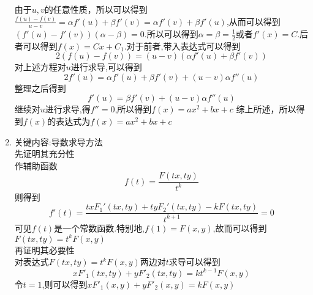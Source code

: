\documentclass[UTF8,a4paper,10pt]{ctexart}
\begin{document}
\begin{flushleft}
\begin{enumerate}
			由于$u,v$的任意性质，所以可以得到$\frac{f(u)-f(v)}{u-v}=\alpha f{'}(u)+\beta f{'}(v)=\alpha f{'}(v)+\beta f{'}(u)$,从而可以得到$(f{'}(u)-f{'}(v))(\alpha-\beta)=0$.所以可以得到$\alpha=\beta=\frac{1}{2}$或者$f{'}(x)=C$.后者可以得到$f(x)=Cx+C_{1}$.对于前者,带入表达式可以得到
			\begin{equation}
				2(f(u)-f(v))=(u-v)(\alpha f{'}(u)+\beta f{'}(v))\nonumber
			\end{equation}
			对上述方程对$u$进行求导,可以得到
			\begin{equation}
				2f{'}(u)=\alpha f{'}(u)+\beta f{'}(v)+(u-v)\alpha f{''}(u)\nonumber
			\end{equation}
			整理之后得到
			\begin{equation}
				f{'}(u)=\beta f{'}(v)+(u-v)\alpha f{''}(u)\nonumber
			\end{equation}
			继续对$u$进行求导,得$f{''}=0$,所以得到$f(x)=ax^{2}+bx+c$
			综上所述，所以得到$f(x)$的表达式为$f(x)=ax^{2}+bx+c$
			\item 关键内容:导数求导方法\\
			先证明其充分性\\
			作辅助函数
			\begin{equation}
				f(t)=\frac{F(tx,ty)}{t^{k}} \nonumber
			\end{equation}
			则得到
			\begin{equation}
				f{'}(t)=\frac{txF_{1}{'}(tx,ty)+tyF_{2}{'}(tx,ty)-kF(tx,ty)}{t^{k+1}}=0\nonumber
			\end{equation}
			可见$f(t)$是一个常数函数.特别地,$f(1)=F(x,y)$,故而可以得到$F(tx,ty)=t^{k}F(x,y)$\\
			再证明其必要性\\
			对表达式$F(tx,ty)=t^{k}F(x,y)$两边对$t$求导可以得到
			\begin{equation}
				xF{'}_{1}(tx,ty)+yF{'}_{2}(tx,ty)=kt^{k-1}F(x,y)\nonumber
			\end{equation}
			令$t=1$,则可以得到$xF{'}_{1}(x,y)+yF{'}_{2}(x,y)=kF(x,y)$
		\end{enumerate}
	\end{flushleft}
\end{document}
